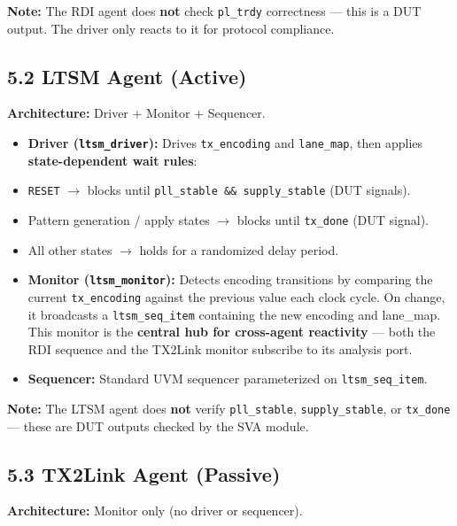 \documentclass[11pt,a4paper]{article}
\begin{document}
\begin{notebox}
\textbf{Note:} The RDI agent does \textbf{not} check \texttt{pl\_trdy} correctness --- this is a DUT output. The driver only reacts to it for protocol compliance.
\end{notebox}

\subsection{5.2 LTSM Agent (Active)}

\textbf{Architecture:} Driver + Monitor + Sequencer.

\begin{itemize}
  \item \textbf{Driver (\texttt{ltsm\_driver}):} Drives \texttt{tx\_encoding} and \texttt{lane\_map}, then applies \textbf{state-dependent wait rules}:
  \item \texttt{RESET} $\rightarrow$ blocks until \texttt{pll\_stable \&\& supply\_stable} (DUT signals).
  \item Pattern generation / apply states $\rightarrow$ blocks until \texttt{tx\_done} (DUT signal).
  \item All other states $\rightarrow$ holds for a randomized delay period.
  \item \textbf{Monitor (\texttt{ltsm\_monitor}):} Detects encoding transitions by comparing the current \texttt{tx\_encoding} against the previous value each clock cycle. On change, it broadcasts a \texttt{ltsm\_seq\_item} containing the new encoding and lane\_map. This monitor is the \textbf{central hub for cross-agent reactivity} --- both the RDI sequence and the TX2Link monitor subscribe to its analysis port.
  \item \textbf{Sequencer:} Standard UVM sequencer parameterized on \texttt{ltsm\_seq\_item}.
\end{itemize}


\begin{notebox}
\textbf{Note:} The LTSM agent does \textbf{not} verify \texttt{pll\_stable}, \texttt{supply\_stable}, or \texttt{tx\_done} --- these are DUT outputs checked by the SVA module.
\end{notebox}

\subsection{5.3 TX2Link Agent (Passive)}

\textbf{Architecture:} Monitor only (no driver or sequencer).
\end{document}

